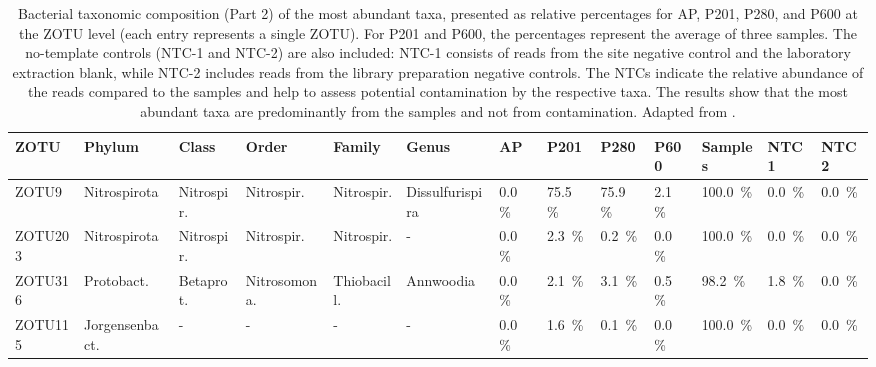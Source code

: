 \begin{table}
\centering
\begin{adjustbox}{max width=0.7\textwidth, max totalheight=0.85\textheight, keepaspectratio}
\renewcommand{\arraystretch}{1.5} %
\footnotesize %
\caption{Bacterial taxonomic composition (Part 2) of the most abundant taxa, presented as relative percentages for AP, P201, P280, and P600 at the ZOTU level (each entry represents a single ZOTU).
For P201 and P600, the percentages represent the average of three samples.
The no-template controls (NTC-1 and NTC-2) are also included: NTC-1 consists of reads from the site negative control and the laboratory extraction blank, while NTC-2 includes reads from the library preparation negative controls.
The NTCs indicate the relative abundance of the reads compared to the samples and help to assess potential contamination by the respective taxa.
The results show that the most abundant taxa are predominantly from the samples and not from contamination.
Adapted from \cite{giroud2025microbio}.}
\label{tabSI:tax_bac_2}
\begin{tabular}{llllllllll||lll}
\toprule
\textbf{ZOTU} & \textbf{Phylum} & \textbf{Class} & \textbf{Order} & \textbf{Family} & \textbf{Genus} & \textbf{AP} & \textbf{P201} & \textbf{P280} & \textbf{P600} & \textbf{Samples} & \textbf{NTC1} & \textbf{NTC2} \\
\midrule
ZOTU9   & Nitrospirota   & Nitrospir.     & Nitrospir.     & Nitrospir.       & Dissulfurispira & \SI{0.0}{\percent}   & \SI{75.5}{\percent} & \SI{75.9}{\percent} & \SI{2.1}{\percent}   & \SI{100.0}{\percent} & \SI{0.0}{\percent}  & \SI{0.0}{\percent} \\
ZOTU203 & Nitrospirota   & Nitrospir.     & Nitrospir.     & Nitrospir.       & -            & \SI{0.0}{\percent}   & \SI{2.3}{\percent}  & \SI{0.2}{\percent}  & \SI{0.0}{\percent}   & \SI{100.0}{\percent} & \SI{0.0}{\percent}  & \SI{0.0}{\percent} \\
ZOTU316 & Protobact.     & Betaprot.      & Nitrosomona.   & Thiobacill.     & Annwoodia     & \SI{0.0}{\percent}   & \SI{2.1}{\percent}  & \SI{3.1}{\percent}  & \SI{0.5}{\percent}   & \SI{98.2}{\percent}  & \SI{1.8}{\percent}  & \SI{0.0}{\percent} \\
ZOTU115 & Jorgensenbact. & -              & -              & -                & -            & \SI{0.0}{\percent}   & \SI{1.6}{\percent}  & \SI{0.1}{\percent}  & \SI{0.0}{\percent}   & \SI{100.0}{\percent} & \SI{0.0}{\percent}  & \SI{0.0}{\percent} \\

\end{tabular}
\end{adjustbox}
\end{table}
